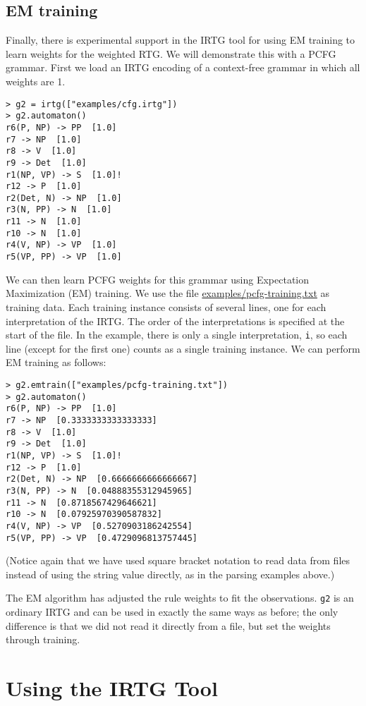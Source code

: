 \documentclass[11pt]{article}
\begin{document}
\subsection{EM training}

Finally, there is experimental support in the IRTG tool for using EM
training to learn weights for the weighted RTG.  We will demonstrate
this with a PCFG grammar. First we load an IRTG encoding of a
context-free grammar in which all weights are 1.

\begin{verbatim}
> g2 = irtg(["examples/cfg.irtg"])
> g2.automaton()
r6(P, NP) -> PP  [1.0]
r7 -> NP  [1.0]
r8 -> V  [1.0]
r9 -> Det  [1.0]
r1(NP, VP) -> S  [1.0]!
r12 -> P  [1.0]
r2(Det, N) -> NP  [1.0]
r3(N, PP) -> N  [1.0]
r11 -> N  [1.0]
r10 -> N  [1.0]
r4(V, NP) -> VP  [1.0]
r5(VP, PP) -> VP  [1.0]
\end{verbatim}

We can then learn PCFG weights for this grammar using Expectation
Maximization (EM) training. We use the file
\url{examples/pcfg-training.txt} as training data. Each training
instance consists of several lines, one for each interpretation of the
IRTG. The order of the interpretations is specified at the start of
the file. In the example, there is only a single interpretation,
\verb?i?, so each line (except for the first one) counts as a single
training instance. We can perform EM training as follows:

\begin{verbatim}
> g2.emtrain(["examples/pcfg-training.txt"])
> g2.automaton()
r6(P, NP) -> PP  [1.0]
r7 -> NP  [0.3333333333333333]
r8 -> V  [1.0]
r9 -> Det  [1.0]
r1(NP, VP) -> S  [1.0]!
r12 -> P  [1.0]
r2(Det, N) -> NP  [0.6666666666666667]
r3(N, PP) -> N  [0.04888355312945965]
r11 -> N  [0.8718567429646621]
r10 -> N  [0.07925970390587832]
r4(V, NP) -> VP  [0.5270903186242554]
r5(VP, PP) -> VP  [0.4729096813757445]
\end{verbatim}

(Notice again that we have used square bracket notation to read data
from files instead of using the string value directly, as in the
parsing examples above.)

The EM algorithm has adjusted the rule weights to fit the
observations. \verb?g2? is an ordinary IRTG and can be used in exactly
the same ways as before; the only difference is that we did not read
it directly from a file, but set the weights through training.


\section{Using the IRTG Tool} \label{sec:using}
\end{document}
